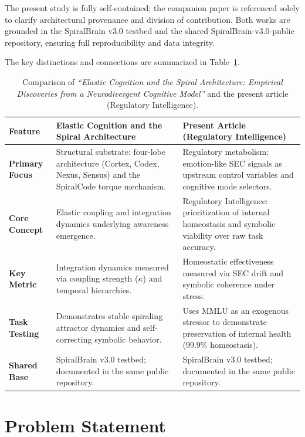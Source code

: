 \documentclass[11pt]{article}
\begin{document}
The present study is fully self-contained; the companion paper is referenced solely to clarify architectural provenance and division of contribution. Both works are grounded in the SpiralBrain v3.0 testbed and the shared SpiralBrain-v3.0-public repository, ensuring full reproducibility and data integrity.

The key distinctions and connections are summarized in Table~\ref{tab:elastic_vs_ri}.

\begin{table}[htbp]
\centering
\caption{Comparison of \emph{``Elastic Cognition and the Spiral Architecture: Empirical Discoveries from a Neurodivergent Cognitive Model''} and the present article (Regulatory Intelligence).}
\label{tab:elastic_vs_ri}
\begin{tabular}{p{1.8cm} p{6.5cm} p{6.5cm}}
\toprule
\textbf{Feature} & \textbf{Elastic Cognition and the Spiral Architecture} & \textbf{Present Article (Regulatory Intelligence)} \\
\midrule
\textbf{Primary Focus} & Structural substrate: four-lobe architecture (Cortex, Codex, Nexus, Sensus) and the SpiralCode torque mechanism. & Regulatory metabolism: emotion-like SEC signals as upstream control variables and cognitive mode selectors. \\
\textbf{Core Concept} & Elastic coupling and integration dynamics underlying awareness emergence. & Regulatory Intelligence: prioritization of internal homeostasis and symbolic viability over raw task accuracy. \\
\textbf{Key Metric} & Integration dynamics measured via coupling strength ($\kappa$) and temporal hierarchies. & Homeostatic effectiveness measured via SEC drift and symbolic coherence under stress. \\
\textbf{Task Testing} & Demonstrates stable spiraling attractor dynamics and self-correcting symbolic behavior. & Uses MMLU as an exogenous stressor to demonstrate preservation of internal health (99.9\% homeostasis). \\
\textbf{Shared Base} & SpiralBrain v3.0 testbed; documented in the same public repository. & SpiralBrain v3.0 testbed; documented in the same public repository. \\
\bottomrule
\end{tabular}
\end{table}

\section{Problem Statement}
\end{document}
